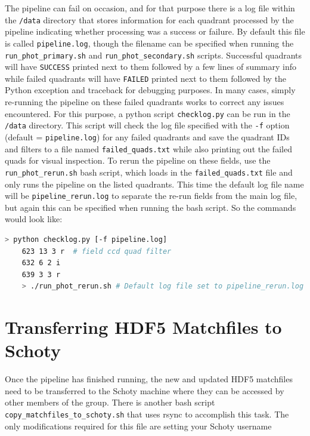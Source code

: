 \documentclass[12pt]{article}
\begin{document}
The pipeline can fail on occasion, and for that purpose there is a log file within the {\tt /data} directory that stores information for each quadrant processed by the pipeline indicating whether processing was a success or failure. By default this file is called {\tt pipeline.log}, though the filename can be specified when running the {\tt run\_phot\_primary.sh} and {\tt run\_phot\_secondary.sh} scripts. Successful quadrants will have {\tt SUCCESS} printed next to them followed by a few lines of summary info while failed quadrants will have {\tt FAILED} printed next to them followed by the Python exception and traceback for debugging purposes. In many cases, simply re-running the pipeline on these failed quadrants works to correct any issues encountered. For this purpose, a python script {\tt checklog.py} can be run in the {\tt /data} directory. This script will check the log file specified with the {\tt -f} option (default = {\tt pipeline.log}) for any failed quadrants and save the quadrant IDs and filters to a file named {\tt failed\_quads.txt} while also printing out the failed quads for visual inspection. To rerun the pipeline on these fields, use the {\tt run\_phot\_rerun.sh} bash script, which loads in the {\tt failed\_quads.txt} file and only runs the pipeline on the listed quadrants. This time the default log file name will be {\tt pipeline\_rerun.log} to separate the re-run fields from the main log file, but again this can be specified when running the bash script. So the commands would look like:

\begin{lstlisting}[gobble=4,language=bash,frame=single, commentstyle=\small\color{red}\ttfamily]
    > python checklog.py [-f pipeline.log]
    623 13 3 r  # field ccd quad filter
    632 6 2 i
    639 3 3 r
    > ./run_phot_rerun.sh # Default log file set to pipeline_rerun.log
\end{lstlisting}


\section{Transferring HDF5 Matchfiles to Schoty}

Once the pipeline has finished running, the new and updated HDF5 matchfiles need to be transferred to the Schoty machine where they can be accessed by other members of the group. There is another bash script {\tt copy\_matchfiles\_to\_schoty.sh} that uses rsync to accomplish this task. The only modifications required for this file are setting your Schoty username
\end{document}
